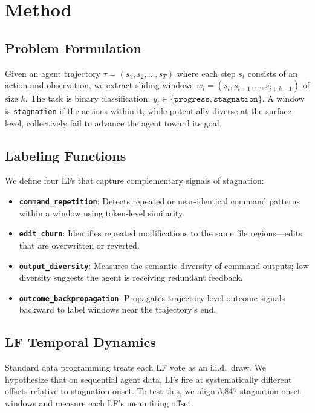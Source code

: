\documentclass[11pt,a4paper]{article}
\begin{document}
\section{Method}
\label{sec:method}

\subsection{Problem Formulation}
Given an agent trajectory $\tau = (s_1, s_2, \ldots, s_T)$ where each step $s_t$ consists of an action and observation, we extract sliding windows $w_i = (s_i, s_{i+1}, \ldots, s_{i+k-1})$ of size $k$. The task is binary classification: $y_i \in \{\texttt{progress}, \texttt{stagnation}\}$. A window is \texttt{stagnation} if the actions within it, while potentially diverse at the surface level, collectively fail to advance the agent toward its goal.

\subsection{Labeling Functions}
\label{sec:lfs}
We define four LFs that capture complementary signals of stagnation:

\begin{itemize}[nosep,leftmargin=*]
\item \textbf{\texttt{command\_repetition}}: Detects repeated or near-identical command patterns within a window using token-level similarity.
\item \textbf{\texttt{edit\_churn}}: Identifies repeated modifications to the same file regions---edits that are overwritten or reverted.
\item \textbf{\texttt{output\_diversity}}: Measures the semantic diversity of command outputs; low diversity suggests the agent is receiving redundant feedback.
\item \textbf{\texttt{outcome\_backpropagation}}: Propagates trajectory-level outcome signals backward to label windows near the trajectory's end.
\end{itemize}

\subsection{LF Temporal Dynamics}
\label{sec:lf-dynamics}

Standard data programming treats each LF vote as an i.i.d.\ draw. We hypothesize that on sequential agent data, LFs fire at systematically different offsets relative to stagnation onset. To test this, we align 3{,}847 stagnation onset windows and measure each LF's mean firing offset.
\end{document}
